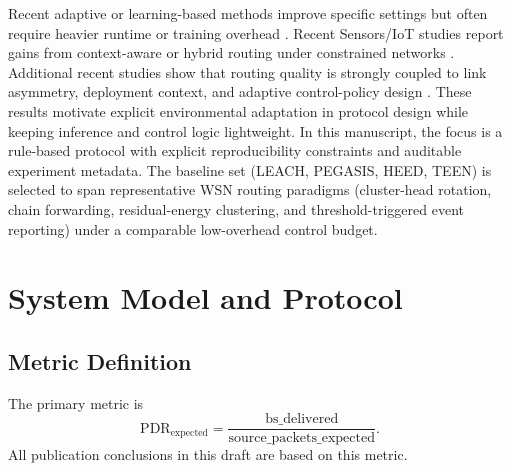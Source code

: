 ﻿\documentclass[sensors,article,submit,moreauthors,pdftex]{Definitions/mdpi}
\begin{document}
Recent adaptive or learning-based methods improve specific settings but often require heavier runtime or training overhead \cite{Ren2024,Okine2024,Chen2019Survey,Naeem2024DRL,Zhang2024DRL,Li2023Reinforcement}. Recent Sensors/IoT studies report gains from context-aware or hybrid routing under constrained networks \cite{ElFouly2023ILP,Dan2024EMRAR,Bhukya2025Hybrid,Kaddi2024GWOCSMA,Lin2024CoopARQ,Wang2024Geographic,Liu2024LSTM}. Additional recent studies show that routing quality is strongly coupled to link asymmetry, deployment context, and adaptive control-policy design \cite{Qin2024NLOSError,Sharma2024QoS,Ogundile2025PPRP,Singh2025Enhanced,Tossa2025Deployment}. These results motivate explicit environmental adaptation in protocol design while keeping inference and control logic lightweight. In this manuscript, the focus is a rule-based protocol with explicit reproducibility constraints and auditable experiment metadata.
The baseline set (LEACH, PEGASIS, HEED, TEEN) is selected to span representative WSN routing paradigms (cluster-head rotation, chain forwarding, residual-energy clustering, and threshold-triggered event reporting) under a comparable low-overhead control budget.

\section{System Model and Protocol}
\subsection{Metric Definition}
The primary metric is
\begin{equation}
\mathrm{PDR}_{\mathrm{expected}} = \frac{\mathrm{bs\_delivered}}{\mathrm{source\_packets\_expected}}.
\end{equation}
All publication conclusions in this draft are based on this metric.
\end{document}
